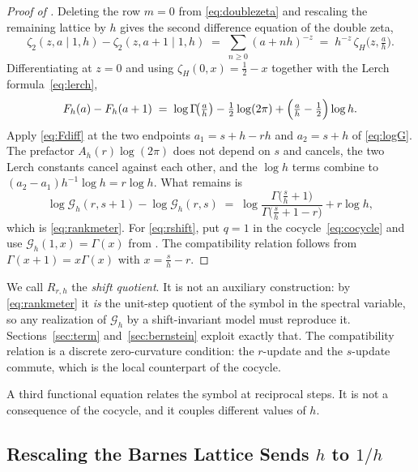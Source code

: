 \documentclass[11pt,letterpaper]{article}
\newcommand{\Gc}{\mathcal{G}}               %
\newcommand{\Fh}{F_h}
\newcommand{\Zt}{\zeta_2}
\newcommand{\Rm}{R}                          %
\begin{document}
\begin{proof}[Proof of ]
Deleting the row $m=0$ from \eqref{eq:doublezeta} and rescaling the remaining
lattice by $h$ gives the second difference equation of the double zeta,
\begin{equation}
  \Zt(z,a\mid 1,h)-\Zt(z,a+1\mid 1,h)
  \;=\;\sum_{n\ge 0}(a+nh)^{-z}
  \;=\;h^{-z}\,\zeta_H\!\bigl(z,\tfrac{a}{h}\bigr).
  \label{eq:mdiff}
\end{equation}
Differentiating at $z=0$ and using $\zeta_H(0,x)=\tfrac12-x$ together with the
Lerch formula~\eqref{eq:lerch},
\begin{equation}
  \Fh(a)-\Fh(a+1)
  \;=\;\log\Gamma\!\bigl(\tfrac{a}{h}\bigr)-\tfrac12\log(2\pi)
  +\Bigl(\tfrac{a}{h}-\tfrac12\Bigr)\log h .
  \label{eq:Fdiff}
\end{equation}
Apply \eqref{eq:Fdiff} at the two endpoints $a_1=s+h-rh$ and $a_2=s+h$ of
\eqref{eq:logG}. The prefactor $A_h(r)\log(2\pi)$ does not depend on $s$ and
cancels, the two Lerch constants cancel against each other, and the $\log h$
terms combine to $(a_2-a_1)h^{-1}\log h=r\log h$. What remains is
\begin{equation*}
  \log\Gc_h(r,s+1)-\log\Gc_h(r,s)
  \;=\;\log\frac{\Gamma\bigl(\tfrac{s}{h}+1\bigr)}{\Gamma\bigl(\tfrac{s}{h}+1-r\bigr)}
  +r\log h,
\end{equation*}
which is \eqref{eq:rankmeter}. For \eqref{eq:rshift}, put $q=1$ in the
cocycle~\eqref{eq:cocycle} and use $\Gc_h(1,x)=\Gamma(x)$ from
. The compatibility relation follows from
$\Gamma(x+1)=x\Gamma(x)$ with $x=\tfrac{s}{h}-r$.
\end{proof}

We call $\Rm_{r,h}$ the \emph{shift quotient}. It is not an auxiliary construction:
by \eqref{eq:rankmeter} it \emph{is} the unit-step quotient of the symbol in the
spectral variable, so any realization of $\Gc_h$ by a shift-invariant model must
reproduce it. Sections~\ref{sec:term} and~\ref{sec:bernstein} exploit exactly
that. The compatibility relation is a discrete zero-curvature condition: the
$r$-update and the $s$-update commute, which is the local counterpart of the
cocycle.

A third functional equation relates the symbol at reciprocal steps. It is not a
consequence of the cocycle, and it couples different values of $h$.

\subsection{Rescaling the Barnes Lattice Sends \texorpdfstring{$h$}{h} to \texorpdfstring{$1/h$}{1/h}}
\end{document}

